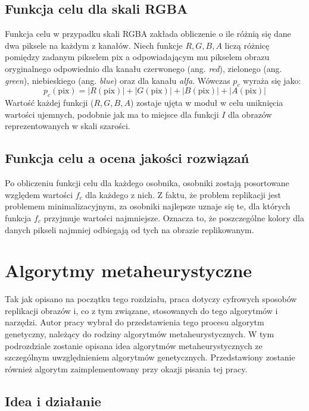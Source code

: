 \subsection{Funkcja celu dla skali RGBA}
Funkcja celu w przypadku skali RGBA zakłada obliczenie o ile różnią się dane dwa piksele na każdym z kanałów. Niech funkcje $R, G, B, A$ liczą różnicę pomiędzy zadanym pikselem $\mathrm{pix}$ a odpowiadającym mu pikselem obrazu oryginalnego odpowiednio dla kanału czerwonego (ang. \textit{red}), zielonego (ang. \textit{green}), niebieskiego (ang. \textit{blue}) oraz dla kanału \textit{alfa}. Wówczas $p_{c}$ wyraża się jako:
\begin{equation}
    p_{c}(\mathrm{pix}) = |R(\mathrm{pix})| + |G(\mathrm{pix})| + |B(\mathrm{\mathrm{pix}})| + |A(\mathrm{pix})|
\end{equation}
Wartość każdej funkcji ($R, G, B, A$) zostaje ujęta w moduł w celu uniknięcia wartości ujemnych, podobnie jak ma to miejsce dla funkcji $I$ dla obrazów reprezentowanych w skali szarości.

\subsection{Funkcja celu a ocena jakości rozwiązań}
Po obliczeniu funkcji celu dla każdego osobnika, osobniki zostają posortowane względem wartości $f_{c}$ dla każdego z nich. Z faktu, że problem replikacji jest problemem minimalizacyjnym, za osobniki najlepsze uznaje się te, dla których funkcja $f_{c}$ przyjmuje wartości najmniejsze. Oznacza to, że poszczególne kolory dla danych pikseli najmniej odbiegają od tych na obrazie replikowanym. 

\section{Algorytmy metaheurystyczne}

Tak jak opisano na początku tego rozdziału, praca dotyczy cyfrowych sposobów replikacji obrazów i, co z tym związane, stosowanych do tego algorytmów i narzędzi. Autor pracy wybrał do przedstawienia tego procesu algorytm genetyczny, należący do rodziny algorytmów metaheurystycznych. W tym podrozdziale zostanie opisana idea algorytmów metaheurystycznych ze szczególnym uwzględnieniem algorytmów genetycznych. Przedstawiony zostanie również algorytm zaimplementowany przy okazji pisania tej pracy.

\subsection{Idea i działanie}

